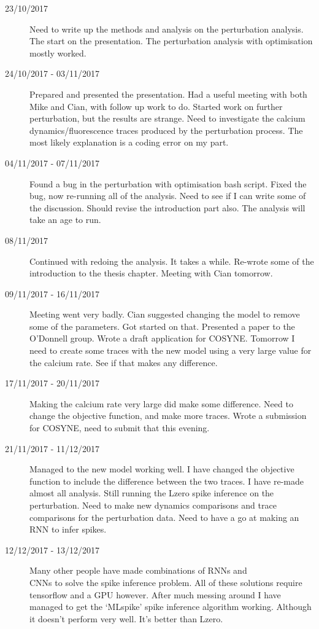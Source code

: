 \documentclass[a4paper,12pt]{article}
\theoremstyle{definition}
\begin{document}
\begin{description}
	\item[23/10/2017] Need to write up the methods and analysis on the perturbation analysis. The start on the presentation. The perturbation analysis with optimisation mostly worked.

	\item[24/10/2017 - 03/11/2017] Prepared and presented the presentation. Had a useful meeting with both Mike and Cian, with follow up work to do. Started work on further perturbation, but the results are strange. Need to investigate the calcium dynamics/fluorescence traces produced by the perturbation process. The most likely explanation is a coding error on my part.

	\item[04/11/2017 - 07/11/2017] Found a bug in the perturbation with optimisation bash script. Fixed the bug, now re-running all of the analysis. Need to see if I can write some of the discussion. Should revise the introduction part also. The analysis will take an age to run.

	\item[08/11/2017] Continued with redoing the analysis. It takes a while. Re-wrote some of the introduction to the thesis chapter. Meeting with Cian tomorrow.

	\item[09/11/2017 - 16/11/2017] Meeting went very badly. Cian suggested changing the model to remove some of the parameters. Got started on that. Presented a paper to the O'Donnell group. Wrote a draft application for COSYNE. Tomorrow I need to create some traces with the new model using a very large value for the calcium rate. See if that makes any difference.

	\item[17/11/2017 - 20/11/2017] Making the calcium rate very large did make some difference. Need to change the objective function, and make more traces. Wrote a submission for COSYNE, need to submit that this evening.

	\item[21/11/2017 - 11/12/2017] Managed to the new model working well. I have changed the objective function to include the difference between the two traces. I have re-made almost all analysis. Still running the Lzero spike inference on the perturbation. Need to make new dynamics comparisons and trace comparisons for the perturbation data. Need to have a go at making an RNN to infer spikes.

	\item[12/12/2017 - 13/12/2017] Many other people have made combinations of RNNs and \\ CNNs to solve the spike inference problem. All of these solutions require tensorflow and a GPU however. After much messing around I have managed to get the `MLspike' spike inference algorithm working. Although it doesn't perform very well. It's better than Lzero.


\end{description}
\end{document}
